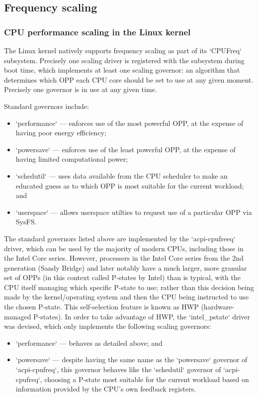 \subsection{Frequency scaling}

\subsubsection{CPU performance scaling in the Linux kernel}

The Linux kernel natively supports frequency scaling as part of its `CPUFreq`
subsystem.\cite{linuxCPUScaling} Precisely one scaling driver is registered with
the subsystem during boot time, which implements at least one scaling governor:
an algorithm that determines which OPP each CPU core should be set to use at
any given moment. Precisely one governor is in use at any given time.

Standard governors include:
\begin{itemize}
    \item `performance` — enforces use of the most powerful OPP, at the expense
        of having poor energy efficiency;
    \item `powersave` — enforces use of the least powerful OPP, at the expense of
        having limited computational power;
    \item `schedutil` — uses data available from the CPU scheduler to make an
        educated guess as to which OPP is most suitable for the current
        workload; and
    \item `userspace` — allows userspace utilties to request use of a
        particular OPP via SysFS.
\end{itemize}

The standard governors listed above are implemented by the `acpi-cpufreeq`
driver, which can be used by the majority of modern CPUs, including those in
the Intel Core series. However, processers in the Intel Core series from the
2nd generation (Sandy Bridge) and later notably have a much larger, more
granular set of OPPs (in this context called P-states by Intel) than is
typical,\cite{intelDevManual} with the CPU itself managing which specific
P-state to use; rather than this decision being made by the kernel/operating
system and then the CPU being instructed to use the chosen P-state.
This self-selection feature is known as HWP (hardware-managed P-states).
In order to take advantage of HWP, the `intel\_pstate` driver was
devised,\cite{linuxIntelPState} which only implements the following scaling
governors:
\begin{itemize}
    \item `performance` — behaves as detailed above; and
    \item `powersave` — despite having the same name as the `powersave`
        governor of `acpi-cpufreq`, this governor behaves like the `schedutil`
        governor of `acpi-cpufreq`, choosing a P-state most suitable for the
        current workload based on information provided by the CPU's own
        feedback registers.
\end{itemize}

